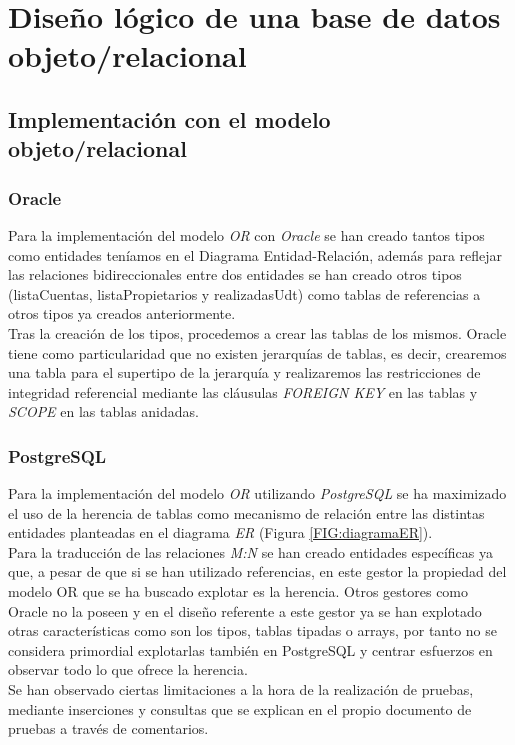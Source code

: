 \documentclass{article}
\begin{document}
\section{Diseño lógico de una base de datos objeto/relacional}
\subsection{Implementación con el modelo objeto/relacional}
\subsubsection{Oracle}
Para la implementación del modelo \emph{OR} con \emph{Oracle} se han creado tantos tipos como entidades teníamos en el Diagrama Entidad-Relación, además para reflejar las relaciones bidireccionales entre dos entidades se han creado otros tipos (listaCuentas, listaPropietarios y realizadasUdt) como tablas de referencias a otros tipos ya creados anteriormente.
\\
Tras la creación de los tipos, procedemos a crear las tablas de los mismos. Oracle tiene como particularidad que no existen jerarquías de tablas, es decir, crearemos una tabla para el supertipo de la jerarquía y realizaremos las restricciones de integridad referencial mediante las cláusulas \emph{FOREIGN KEY} en las tablas y \emph{SCOPE} en las tablas anidadas.
\\

\subsubsection{PostgreSQL}

Para la implementación del modelo \emph{OR} utilizando \emph{PostgreSQL} se ha maximizado el uso de la herencia de tablas como mecanismo de relación entre las distintas entidades planteadas en el diagrama \emph{ER} (Figura \ref{FIG:diagramaER}).\\
Para la traducción de las relaciones \emph{M:N} se han creado entidades específicas ya que, a pesar de que si se han utilizado referencias, en este gestor la propiedad del modelo OR que se ha buscado explotar es la herencia. Otros gestores como Oracle no la poseen y en el diseño referente a este gestor ya se han explotado otras características como son los tipos, tablas tipadas o arrays, por tanto no se considera primordial explotarlas también en PostgreSQL y centrar esfuerzos en observar todo lo que ofrece la herencia.\\
Se han observado ciertas limitaciones a la hora de la realización de pruebas, mediante inserciones y consultas que se explican en el propio documento de pruebas a través de comentarios.\\
\\
\end{document}
